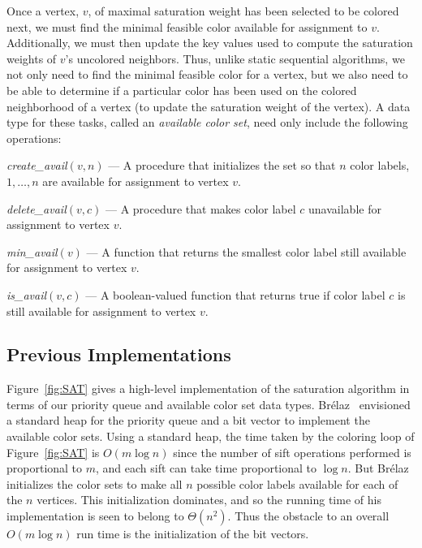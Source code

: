 Once a vertex, $v$, of maximal saturation weight has been selected to be
colored next, we must find the minimal feasible color available for assignment
to $v$.  Additionally, we must then update the key values used to compute the
saturation weights of $v$'s uncolored neighbors.  Thus, unlike static
sequential algorithms, we not only need to find the minimal 
feasible color for a vertex, but we also need to be able to determine if a
particular color has been used on the colored neighborhood of a vertex
(to update the saturation weight of the vertex).  A data type for
these tasks, called an {\em available color set}, need only include the
following operations:
\begin{list}{}
   {\setlength{\labelwidth}{1.75in}
    \setlength{\leftmargin}{1.75in}
    \setlength{\rightmargin}{0in}
    \setlength{\labelsep}{0in}
   }
\item[{\em create\_avail\/$(v, n)$}\hfill]
--- A procedure that initializes the set so that $n$ color labels, $1, \ldots ,n$
are available for assignment to vertex $v$.
\item[{\em delete\_avail\/$(v, c)$}\hfill]
--- A procedure that makes color label $c$ unavailable for assignment to vertex $v$.
\item[{\em min\_avail\/$(v)$}\hfill]
--- A function that returns the smallest color label still available 
for assignment to vertex $v$.
\item[{\em is\_avail\/$(v, c)$}\hfill]
--- A boolean-valued function that returns true if color label $c$
is still available for assignment to vertex $v$.
\end{list}

\subsection{Previous Implementations}
Figure~\ref{fig:SAT} gives a high-level implementation of the saturation 
algorithm in terms of our priority queue and available color set data types.  
Br\'{e}laz~\cite{BRE1979} envisioned a standard heap for the priority queue 
and a bit vector to implement the available color sets. Using a
standard heap, the time taken by the coloring loop of Figure~\ref{fig:SAT}
is $O(m \log n)$ since the number of sift operations performed is proportional 
to $m$, and each sift can take time proportional to $\log n$.  
But Br\'{e}laz initializes the color sets to make all $n$ possible color 
labels available for each of the $n$ vertices.  This initialization dominates, 
and so the running time of his implementation is seen to belong to 
$\Theta(n^2)$. Thus the obstacle to an overall $O(m \log n)$ run time is the
initialization of the bit vectors.  

